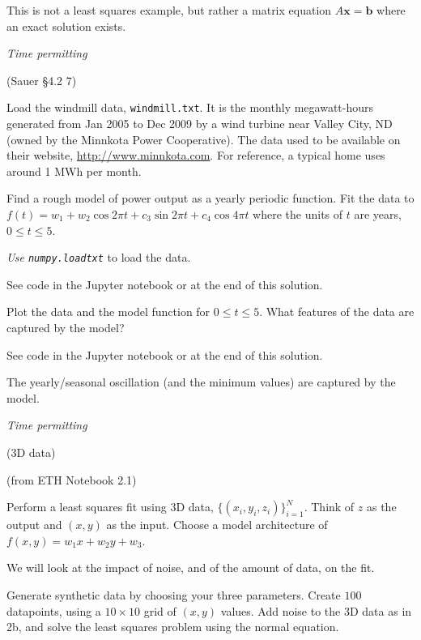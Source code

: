 \documentclass[12pt,letterpaper,answers]{exam}
\newcommand{\vc}[1]{\boldsymbol{#1}}
\begin{document}
\begin{questions}
This is not a least squares example, but rather a matrix equation $A\vc{x} = \vc{b}$ where an exact solution exists.


\question \emph{Time permitting} 

(Sauer \S4.2 7)

Load the windmill data, \texttt{windmill.txt}.  It is the monthly megawatt-hours generated from Jan 2005 to Dec 2009 by a wind turbine near Valley City, ND (owned by the Minnkota Power Cooperative).  The data used to be available on their website, \url{http://www.minnkota.com}.  For reference, a typical home uses around 1 MWh per month.
\begin{parts}
\item Find a rough model of power output as a yearly periodic function.  Fit the data to $f(t) = w_1 + w_2\cos 2\pi t + c_3 \sin 2\pi t + c_4 \cos 4 \pi t$ where the units of $t$ are years, $0\leq t\leq 5$.

\emph{Use \texttt{numpy.loadtxt}} to load the data.

\begin{solution}
    See code in the Jupyter notebook or at the end of this solution.
\end{solution}

\item Plot the data and the model function for $0\leq t\leq 5$.  What features of the data are captured by the model?

\begin{solution}
    See code in the Jupyter notebook or at the end of this solution.

    The yearly/seasonal oscillation (and the minimum values) are captured by the model.
\end{solution}

\end{parts}


\question \emph{Time permitting}

(3D data) 

(from ETH Notebook 2.1)

Perform a least squares fit using 3D data, $\{(x_i,y_i,z_i)\}_{i=1}^N$.  Think of $z$ as the output and $(x,y)$ as the input.  Choose a model architecture of $f(x,y) = w_1 x + w_2 y + w_3$.

We will look at the impact of noise, and of the amount of data, on the fit.

\begin{parts}
\item Generate synthetic data by choosing your three parameters.  Create $100$ datapoints, using a $10\times 10$ grid of $(x,y)$ values.  Add noise to the 3D data as in 2b, and solve the least squares problem using the normal equation.


\end{parts}
\end{questions}
\end{document}
